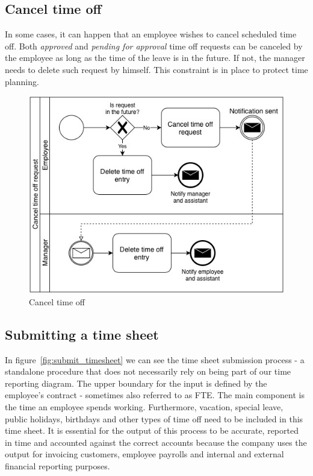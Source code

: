 \documentclass[12pt,oneside]{fithesis2}
\begin{document}
\subsection*{Cancel time off}
In some cases, it can happen that an employee wishes to cancel scheduled time off. Both \textit{approved} and \textit{pending for approval} time off requests can be canceled by the employee as long as the time of the leave is in the future. If not, the manager needs to delete such request by himself. This constraint is in place to protect time planning.

\begin{figure}[H]
    \centering
    \includegraphics[width=\textwidth]{images/cancelling_time_off.jpg}
    \caption{Cancel time off}
    \label{fig:cancelling_time_off}
\end{figure}

\newpage
\subsection*{Submitting a time sheet}
In figure~\ref{fig:submit_timesheet} we can see the time sheet submission process - a standalone procedure that does not necessarily rely on being part of our time reporting diagram. The upper boundary for the input is defined by the employee's contract - sometimes also referred to as FTE. The main component is the time an employee spends working. Furthermore, vacation, special leave, public holidays, birthdays and other types of time off need to be included in this time sheet. It is essential for the output of this process to be accurate, reported in time and accounted against the correct accounts because the company uses the output for invoicing customers, employee payrolls and internal and external financial reporting purposes.
\end{document}
